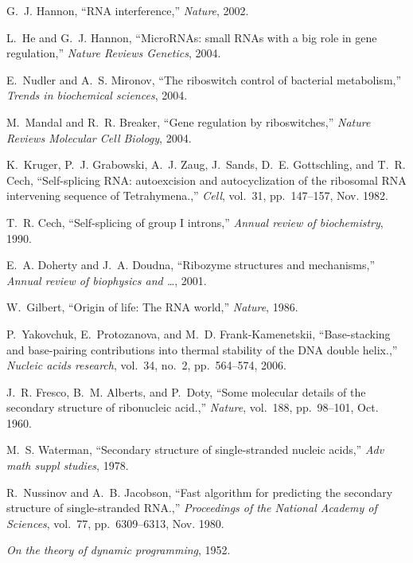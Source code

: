 \documentclass[11pt, oneside]{Thesis} %
\begin{document}
\begin{thebibliography}{100}
G.~J. Hannon, ``{RNA interference},'' {\em Nature}, 2002.

L.~He and G.~J. Hannon, ``{MicroRNAs: small RNAs with a big role in gene
  regulation},'' {\em Nature Reviews Genetics}, 2004.

E.~Nudler and A.~S. Mironov, ``{The riboswitch control of bacterial
  metabolism},'' {\em Trends in biochemical sciences}, 2004.

M.~Mandal and R.~R. Breaker, ``{Gene regulation by riboswitches},'' {\em Nature
  Reviews Molecular Cell Biology}, 2004.

K.~Kruger, P.~J. Grabowski, A.~J. Zaug, J.~Sands, D.~E. Gottschling, and T.~R.
  Cech, ``{Self-splicing RNA: autoexcision and autocyclization of the ribosomal
  RNA intervening sequence of Tetrahymena.},'' {\em Cell}, vol.~31,
  pp.~147--157, Nov. 1982.

T.~R. Cech, ``{Self-splicing of group I introns},'' {\em Annual review of
  biochemistry}, 1990.

E.~A. Doherty and J.~A. Doudna, ``{Ribozyme structures and mechanisms},'' {\em
  Annual review of biophysics and {\ldots}}, 2001.

W.~Gilbert, ``{Origin of life: The RNA world},'' {\em Nature}, 1986.

P.~Yakovchuk, E.~Protozanova, and M.~D. Frank-Kamenetskii, ``{Base-stacking and
  base-pairing contributions into thermal stability of the DNA double
  helix.},'' {\em Nucleic acids research}, vol.~34, no.~2, pp.~564--574, 2006.

J.~R. Fresco, B.~M. Alberts, and P.~Doty, ``{Some molecular details of the
  secondary structure of ribonucleic acid.},'' {\em Nature}, vol.~188,
  pp.~98--101, Oct. 1960.

M.~S. Waterman, ``{Secondary structure of single-stranded nucleic acids},''
  {\em Adv math suppl studies}, 1978.

R.~Nussinov and A.~B. Jacobson, ``{Fast algorithm for predicting the secondary
  structure of single-stranded RNA.},'' {\em Proceedings of the National
  Academy of Sciences}, vol.~77, pp.~6309--6313, Nov. 1980.

{\em {On the theory of dynamic programming}}, 1952.


\end{thebibliography}
\end{document}
